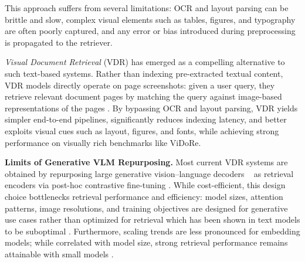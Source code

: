 This approach suffers from several limitations: OCR and layout parsing can be brittle and slow, complex visual elements such as tables, figures, and typography are often poorly captured, and any error or bias introduced during preprocessing is propagated to the retriever. %

\textit{Visual Document Retrieval} (VDR) has emerged as a compelling alternative to such text-based systems. Rather than indexing pre-extracted textual content, VDR models directly operate on page screenshots: given a user query, they retrieve relevant document pages by matching the query against image-based representations of the pages \citep{faysse2025colpaliefficientdocumentretrieval}. By bypassing OCR and layout parsing, VDR yields simpler end-to-end pipelines, significantly reduces indexing latency, and better exploits visual cues such as layout, figures, and fonts, while achieving strong performance on visually rich benchmarks like ViDoRe. 

\textbf{Limits of Generative VLM Repurposing.} Most current VDR systems are obtained by repurposing large generative vision–language decoders ~\citep{alayrac2022flamingovisuallanguagemodel} as retrieval encoders via post-hoc contrastive fine-tuning \citep{ma2024unifyingmultimodalretrievaldocument,faysse2025colpaliefficientdocumentretrieval,jiang2025vlm2vectrainingvisionlanguagemodels}. While cost-efficient, this design choice bottlenecks retrieval performance and efficiency: model sizes, attention patterns, image resolutions, and training objectives are designed for generative use cases rather than optimized for retrieval which has been shown in text models to be suboptimal \citep{lee2025nvembedimprovedtechniquestraining, gisserotboukhlef2025pretrainencodersmaskedlanguage}. Furthermore, scaling trends \citep{wei2022emergentabilitieslargelanguage} are less pronounced for embedding models; while correlated with model size, strong retrieval performance remains attainable with small models \citep{clavié2024bettermonolingualjapaneseretrievers}.

